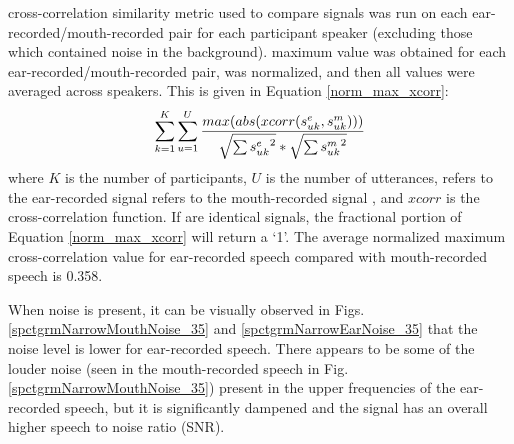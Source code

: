 \DIFaddend cross-correlation similarity metric used to compare signals was run on each ear-recorded/mouth-recorded pair for each participant speaker (excluding those which contained noise in the background).  \DIFdelbegin {}\DIFdelend \DIFaddbegin {}\DIFaddend maximum value was obtained for each ear-recorded/mouth-recorded pair, was normalized, and then all values were averaged across speakers.  This is given in Equation \ref{norm_max_xcorr}:
%
\begin{equation}\label{norm_max_xcorr}
\sum_{k=1}^{K} \sum_{u=1}^{U} \DIFdelbegin %
\DIFdelend \DIFaddbegin \dfrac{max(abs(xcorr(s^e_{uk}, s^m_{uk})))}{\sqrt{\sum {s^e_{uk}}^2}*\sqrt{\sum {s^m_{uk}}^2}}
\DIFaddend \end{equation}
%
where $K$ is the number of participants, $U$ is the number of utterances, \DIFdelbegin {}\DIFdelend \DIFaddbegin {}\DIFaddend refers to the ear-recorded signal \DIFdelbegin {}\DIFdelend \DIFaddbegin {}\DIFaddend refers to the mouth-recorded signal \DIFaddbegin {}\DIFaddend , and $xcorr$ is the cross-correlation function. If \DIFdelbegin {}\DIFdelend \DIFaddbegin {}\DIFaddend are identical signals, the fractional portion of Equation \ref{norm_max_xcorr} will return a `1'.  The average normalized maximum cross-correlation value for ear-recorded speech compared with mouth-recorded speech is 0.358.

When noise is present, it can be visually observed in Figs. \ref{spctgrmNarrowMouthNoise_35} and \ref{spctgrmNarrowEarNoise_35} that the noise level is lower for ear-recorded speech.  There appears to be some of the louder noise (seen in the mouth-recorded speech in Fig. \ref{spctgrmNarrowMouthNoise_35}) present in the upper frequencies of the ear-recorded speech, but it is significantly dampened and the signal has an overall higher speech to noise ratio (SNR).

